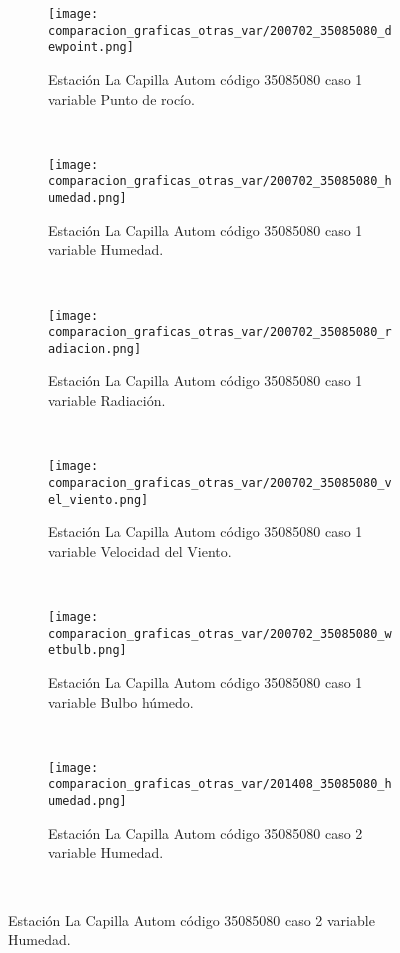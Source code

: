 \begin{figure}[H]
\centering
\begin{subfigure}[normla]{0.4\textwidth}
\caption{Estación La Capilla Autom código 35085080 caso 1 variable Punto de rocío.}
\texttt{[image: comparacion\_graficas\_otras\_var/200702\_35085080\_dewpoint.png]}
\end{subfigure}
~
\begin{subfigure}[normla]{0.4\textwidth}
\caption{Estación La Capilla Autom código 35085080 caso 1 variable Humedad.}
\texttt{[image: comparacion\_graficas\_otras\_var/200702\_35085080\_humedad.png]}
\end{subfigure}
~
\begin{subfigure}[normla]{0.4\textwidth}
\caption{Estación La Capilla Autom código 35085080 caso 1 variable Radiación.}
\texttt{[image: comparacion\_graficas\_otras\_var/200702\_35085080\_radiacion.png]}
\end{subfigure}
~
\begin{subfigure}[normla]{0.4\textwidth}
\caption{Estación La Capilla Autom código 35085080 caso 1 variable Velocidad del Viento.}
\texttt{[image: comparacion\_graficas\_otras\_var/200702\_35085080\_vel\_viento.png]}
\end{subfigure}
~
\begin{subfigure}[normla]{0.4\textwidth}
\caption{Estación La Capilla Autom código 35085080 caso 1 variable Bulbo húmedo.}
\texttt{[image: comparacion\_graficas\_otras\_var/200702\_35085080\_wetbulb.png]}
\end{subfigure}
~
\begin{subfigure}[normla]{0.4\textwidth}
\caption{Estación La Capilla Autom código 35085080 caso 2 variable Humedad.}
\texttt{[image: comparacion\_graficas\_otras\_var/201408\_35085080\_humedad.png]}
\end{subfigure}
~
\end{figure}
           
